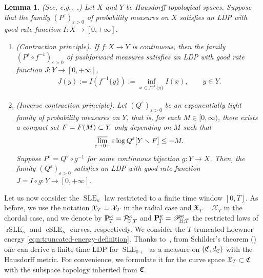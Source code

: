 \documentclass[a4paper, 11pt]{article}
\newtheorem{lemA}[theorem]{Lemma}
\theoremstyle{definition}
\numberwithin{equation}{section}
\numberwithin{figure}{section}
\renewcommand{\limsup}{\varlimsup}
\newcommand{\SLE}[1][]{\operatorname{SLE}_{#1}}
\newcommand{\rSLE}[1][]{\operatorname{rSLE}_{#1}}
\newcommand{\cSLE}[1][]{\operatorname{cSLE}_{#1}}
\newcommand{\Dpaths}[1][]{\cX_{#1}}
\newcommand{\Hpaths}[1][]{\mathscr{X}_{#1}} %
\newcommand{\Xpaths}[1][]{\mathfrak{X}_{#1}}
\newcommand{\dCcompsets}{d_{\Ccompsets}}
\newcommand{\rDmeasure}[2][]{\mathcal{P}^{#2}_{\!\bD;#1}}
\newcommand{\cHmeasure}[2][]{\mathscr{P}^{#2}_{\!\bH;#1}}
\newcommand{\Xmeasure}[2][]{\mathbf{P}^{#2}_{\!#1}}
\begin{document}
\begin{lemA} \textnormal{(See, e.g.,~\cite[Theorems~4.2.3 and~4.2.4]{Dembo-Zeitouni:Large_deviations_techniques_and_applications}.)}
\label{thm:contraction-principle} 
Let $X$ and $Y$ be Hausdorff topological spaces. 
Suppose that the family $(P^\varepsilon)_{\varepsilon>0}$ of probability measures on $X$ satisfies an LDP with good rate function $I \colon X \to [0,+\infty]$. 
\begin{enumerate}[leftmargin=*, label=\textnormal{(\roman*)}]
\item \label{item:Contraction_principle}
\textnormal{(Contraction principle).} 
If $f \colon X \to Y$ is continuous, then the family $(P^\varepsilon\circ f^{-1})_{\varepsilon > 0}$ 
of pushforward measures satisfies an LDP with good rate function $J \colon Y \to [0,+\infty]$, 
\begin{align*}
J(y) := I(f^{-1}\{y\}) 
:= \inf_{x \in f^{-1}\{y\}} I(x) , \qquad y \in Y .
\end{align*}
		
\item \label{item:Inverse_contraction_principle}
\textnormal{(Inverse contraction principle).} 
Let $(Q^\varepsilon)_{\varepsilon > 0}$ be an exponentially tight family of probability measures on $Y$, that is, 
for each $M \in [0,\infty)$, there exists a compact set $F = F(M) \subset Y$ only depending on $M$ such that
\begin{align*}
\limsup_{\varepsilon \to 0+}\varepsilon \log Q^\varepsilon[Y \smallsetminus \compact] \le -M.
\end{align*}
Suppose $P^\varepsilon = Q^\varepsilon \circ g^{-1}$ for some continuous bijection $g \colon Y \to X$. 
Then, the family $(Q^\varepsilon)_{\varepsilon > 0}$ satisfies an LDP with good rate function $J = I \circ g \colon Y \to [0,+\infty]$.\end{enumerate}
\end{lemA}


Let us now consider the $\SLE[\kappa]$ law restricted to a finite time window $[0,T]$. 
As before, we use the notation 
$\Xpaths[T] = \Dpaths[T]$ in the radial case
and $\Xpaths[T] = \Hpaths[T]$ in the chordal case, and we denote by 
$\Xmeasure[T]{\kappa} = \rDmeasure[T]{\kappa}$ and $\Xmeasure[T]{\kappa} = \cHmeasure[T]{\kappa}$ 
the restricted laws of $\rSLE[\kappa]$ and $\cSLE[\kappa]$ curves, respectively. 
We consider the $T$-truncated Loewner energy \eqref{eqn:truncated-energy-definition}.
Thanks to~, from Schilder's theorem () one can derive 
a finite-time LDP for $\SLE[0+]$ as a measure on $(\Ccompsets,\dCcompsets)$ with the Hausdorff metric.
For convenience, we formulate it for the curve space $\Xpaths[T] \subset \Ccompsets$ with the subspace topology inherited from $\mathfrak{C}$. 
\end{document}
